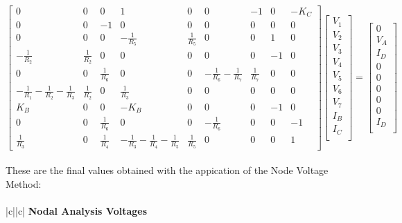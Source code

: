 \[
\begin{bmatrix}
0 & 0 & 0 & 1 & 0 & 0 & -1 & 0 & -K_C\\
0 & 0 & -1 & 0 & 0 & 0 & 0 & 0 & 0\\ 
0 & 0 & 0 & -\frac{1}{R_5} & \frac{1}{R_5} & 0 & 0 & 1 & 0\\
-\frac{1}{R_2} & \frac{1}{R_2} & 0 & 0 & 0 & 0 & 0 & -1 & 0\\
0 & 0 & \frac{1}{R_6} & 0 & 0 & -\frac{1}{R_6}-\frac{1}{R_7}&\frac{1}{R_7} & 0 & 0\\ 
-\frac{1}{R_1}-\frac{1}{R_2}-\frac{1}{R_3} & \frac{1}{R_2} & 0 & \frac{1}{R_3} & 0 & 0 & 0 & 0 & 0\\ 
K_B & 0 & 0 & -K_B & 0 & 0 & 0 & -1 & 0\\ 
0 & 0 & \frac{1}{R_6} & 0 & 0 & -\frac{1}{R_6} & 0 & 0 & -1\\ 
\frac{1}{R_3} & 0 & \frac{1}{R_4} & -\frac{1}{R_3}-\frac{1}{R_4}-\frac{1}{R_5} & \frac{1}{R_5} & 0 & 0 & 0 & 1
\end{bmatrix}
\begin{bmatrix}
V_1\\
V_2\\
V_3\\
V_4\\
V_5\\
V_6\\
V_7\\
I_B\\
I_C\\
\end{bmatrix}
=
\begin{bmatrix}
0\\
V_A\\
I_D\\
0\\
0\\
0\\
0\\
0\\
I_D\\
\end{bmatrix}
\]

\paragraph{}
These are the final values obtained with the appication of the Node Voltage Method:
\paragraph{}
\begin{center}
   \begin{tabular}{|c||c|}
      \hline    
       {\bf Nodal Analysis Voltages} \\
      \hline

        
     
   \end{tabular}
\end{center}   
